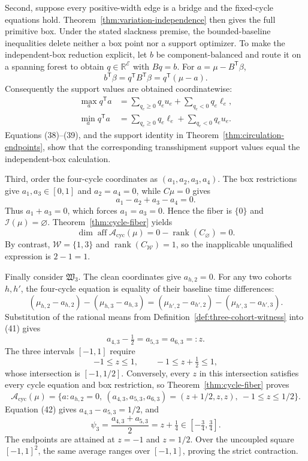 Second, suppose every positive-width edge is a bridge and the fixed-cycle equations hold.  Theorem~\ref{thm:variation-independence} then gives the full primitive box.  Under the stated slackness premise, the bounded-baseline inequalities delete neither a box point nor a support optimizer.  To make the independent-box reduction explicit, let \(b\) be component-balanced and route it on a spanning forest to obtain \(q\in\mathbb R^{\mathcal E}\) with \(Bq=b\).  For \(a=\mu-B^{\mathsf T}\beta\),
\[
 b^{\mathsf T}\beta
 =q^{\mathsf T}B^{\mathsf T}\beta
 =q^{\mathsf T}(\mu-a).
\tag{38}
\]
Consequently the support values are obtained coordinatewise:
\[
 \begin{aligned}
 \max_a q^{\mathsf T}a
 &=\sum_{q_e\ge0}q_eu_e+\sum_{q_e<0}q_e\ell_e,\\
 \min_a q^{\mathsf T}a
 &=\sum_{q_e\ge0}q_e\ell_e+\sum_{q_e<0}q_eu_e.
 \end{aligned}
\tag{39}
\]
Equations (38)--(39), and the support identity in Theorem~\ref{thm:circulation-endpoints}, show that the corresponding transshipment support values equal the independent-box calculation.

Third, order the four-cycle coordinates as \((a_1,a_2,a_3,a_4)\).  The box restrictions give \(a_1,a_3\in[0,1]\) and \(a_2=a_4=0\), while \(C\mu=0\) gives
\[
 a_1-a_2+a_3-a_4=0.
\]
Thus \(a_1+a_3=0\), which forces \(a_1=a_3=0\).  Hence the fiber is \(\{0\}\) and \(\mathcal I(\mu)=\varnothing\).  Theorem~\ref{thm:cycle-fiber} yields
\[
 \dim\operatorname{aff}\mathcal A_{\mathrm{cyc}}(\mu)
 =0-\operatorname{rank}(C_{\varnothing})=0.
\tag{40}
\]
By contrast, \(\mathcal W=\{1,3\}\) and \(\operatorname{rank}(C_{\mathcal W})=1\), so the inapplicable unqualified expression is \(2-1=1\).

Finally consider \(\mathfrak W_3\).  The clean coordinates give \(a_{h,2}=0\).  For any two cohorts \(h,h'\), the four-cycle equation is equality of their baseline time differences:
\[
 (\mu_{h,2}-a_{h,2})-(\mu_{h,3}-a_{h,3})
 = (\mu_{h',2}-a_{h',2})-(\mu_{h',3}-a_{h',3}).
\tag{41}
\]
Substitution of the rational means from Definition~\ref{def:three-cohort-witness} into (41) gives
\[
 a_{4,3}-\tfrac12=a_{5,3}=a_{6,3}=:z.
\tag{42}
\]
The three intervals \([-1,1]\) require
\[
 -1\le z\le1,
 \qquad
 -1\le z+\tfrac12\le1,
\]
whose intersection is \([-1,1/2]\).  Conversely, every \(z\) in this intersection satisfies every cycle equation and box restriction, so Theorem~\ref{thm:cycle-fiber} proves
\[
 \mathcal A_{\mathrm{cyc}}(\mu)
 =\{a:a_{h,2}=0,\ (a_{4,3},a_{5,3},a_{6,3})=(z+1/2,z,z),\ -1\le z\le1/2\}.
\tag{43}
\]
Equation (42) gives \(a_{4,3}-a_{5,3}=1/2\), and
\[
 \psi_3=\frac{a_{4,3}+a_{5,3}}{2}=z+\tfrac14
 \in[-\tfrac34,\tfrac34].
\tag{44}
\]
The endpoints are attained at \(z=-1\) and \(z=1/2\).  Over the uncoupled square \([-1,1]^2\), the same average ranges over \([-1,1]\), proving the strict contraction.
